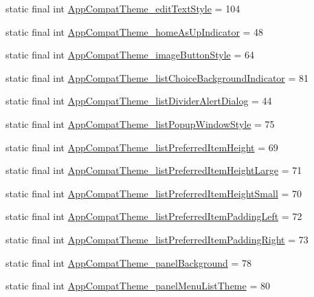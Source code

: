 \begin{DoxyCompactItemize}
\item 
static final int \hyperlink{classproject4_1_1xaria_1_1R_1_1styleable_a9d7977c472c0684d034633f96e9590ef}{App\+Compat\+Theme\+\_\+edit\+Text\+Style} = 104
\item 
static final int \hyperlink{classproject4_1_1xaria_1_1R_1_1styleable_a9ff6722d4ca5847217d1afa321456b6e}{App\+Compat\+Theme\+\_\+home\+As\+Up\+Indicator} = 48
\item 
static final int \hyperlink{classproject4_1_1xaria_1_1R_1_1styleable_a58cb61a783e430c03d51ecf0f3a7b145}{App\+Compat\+Theme\+\_\+image\+Button\+Style} = 64
\item 
static final int \hyperlink{classproject4_1_1xaria_1_1R_1_1styleable_a3c9ed2db305731d7023349657b57ffe2}{App\+Compat\+Theme\+\_\+list\+Choice\+Background\+Indicator} = 81
\item 
static final int \hyperlink{classproject4_1_1xaria_1_1R_1_1styleable_a736eb873329f632a3c8ce494223c9a1b}{App\+Compat\+Theme\+\_\+list\+Divider\+Alert\+Dialog} = 44
\item 
static final int \hyperlink{classproject4_1_1xaria_1_1R_1_1styleable_a7a98332996662c01b4f98ddc8776aa86}{App\+Compat\+Theme\+\_\+list\+Popup\+Window\+Style} = 75
\item 
static final int \hyperlink{classproject4_1_1xaria_1_1R_1_1styleable_a6f1d16f32d0ee16e2782714f155092ff}{App\+Compat\+Theme\+\_\+list\+Preferred\+Item\+Height} = 69
\item 
static final int \hyperlink{classproject4_1_1xaria_1_1R_1_1styleable_a950e1a218f4b3586130f637e6ddfdcfb}{App\+Compat\+Theme\+\_\+list\+Preferred\+Item\+Height\+Large} = 71
\item 
static final int \hyperlink{classproject4_1_1xaria_1_1R_1_1styleable_af5bdb2bf5ceb768d50348bb1dc8c469d}{App\+Compat\+Theme\+\_\+list\+Preferred\+Item\+Height\+Small} = 70
\item 
static final int \hyperlink{classproject4_1_1xaria_1_1R_1_1styleable_aacb89a8e9a344b6bb4f794a6a33a8f1c}{App\+Compat\+Theme\+\_\+list\+Preferred\+Item\+Padding\+Left} = 72
\item 
static final int \hyperlink{classproject4_1_1xaria_1_1R_1_1styleable_a740af6d810089e93e6259d049551e18b}{App\+Compat\+Theme\+\_\+list\+Preferred\+Item\+Padding\+Right} = 73
\item 
static final int \hyperlink{classproject4_1_1xaria_1_1R_1_1styleable_ac551be8c36d995c3e33f28f517d7a324}{App\+Compat\+Theme\+\_\+panel\+Background} = 78
\item 
static final int \hyperlink{classproject4_1_1xaria_1_1R_1_1styleable_a1d930daeea752accaa963f15053cb96c}{App\+Compat\+Theme\+\_\+panel\+Menu\+List\+Theme} = 80

\end{DoxyCompactItemize}
